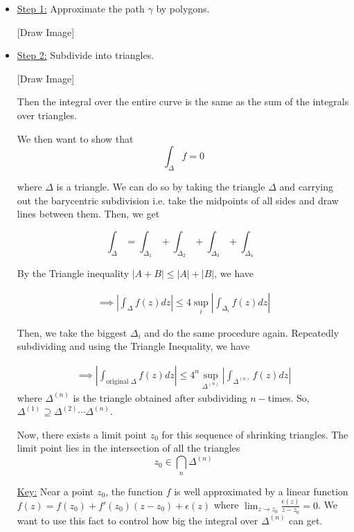 \documentclass{article}
\begin{document}
\begin{itemize}
\vskip 0.5cm
\item \underline{Step 1:} Approximate the path $\gamma$ by polygons.

\vskip 0.25cm
[Draw Image]

\vskip 0.5cm
\item \underline{Step 2:} Subdivide into triangles.

\vskip 0.25cm
[Draw Image]

\vskip 0.25cm
Then the integral over the entire curve is the same as the sum of the integrals over triangles.

We then want to show that 
\[ \int_{\Delta} f = 0\]

where $\Delta$ is a triangle. We can do so by taking the triangle $\Delta$ and carrying out the barycentric subdivision i.e. take the midpoints of all sides and draw lines between them. Then, we get 

\[ \int_{\Delta}  = \int_{\Delta_{1}} + \int_{\Delta_{2}} + \int_{\Delta_{3}} + \int_{\Delta_{4}}   \]

By the Triangle inequality $\left| A + B \right| \leq \left| A \right| + \left|B \right|$, we have 

\begin{align*}
  \implies \left| \int_{\Delta} f(z)dz \right| \leq 4 \sup_{i} \left| \int_{\Delta_{i}} f(z)dz \right|
\end{align*}

Then, we take the biggest $\Delta_i$ and do the same procedure again. Repeatedly subdividing and using the Triangle Inequality, we have 

\begin{align*}
  \implies \left| \int_{\text{original }\Delta} f(z)dz \right| \leq 4^n \sup_{\Delta^{(n)}} \left| \int_{\Delta^{(n)}} f(z)dz \right|
\end{align*}
where $\Delta^{(n)}$ is the triangle obtained after subdividing $n-$times. So, $\Delta^{(1)} \supseteq \Delta^{(2)} \cdots \Delta^{(n)}$.

Now, there exists a limit point $z_0$ for this sequence of shrinking triangles. The limit point lies in the intersection of all the triangles
\[ z_0 \in \bigcap_{n} \Delta^{(n)} \]

\vskip 0.25cm
\underline{Key:} Near a point $z_0$, the function $f$ is well approximated by a linear function $f(z) = f(z_0) + f'(z_0)(z-z_0) + \epsilon(z)$ where $\lim_{z \rightarrow z_0} \frac{\epsilon(z)}{z - z_0} = 0$. We want to use this fact to control how big the integral over $\Delta^{(n)}$ can get.


\end{itemize}
\end{document}
